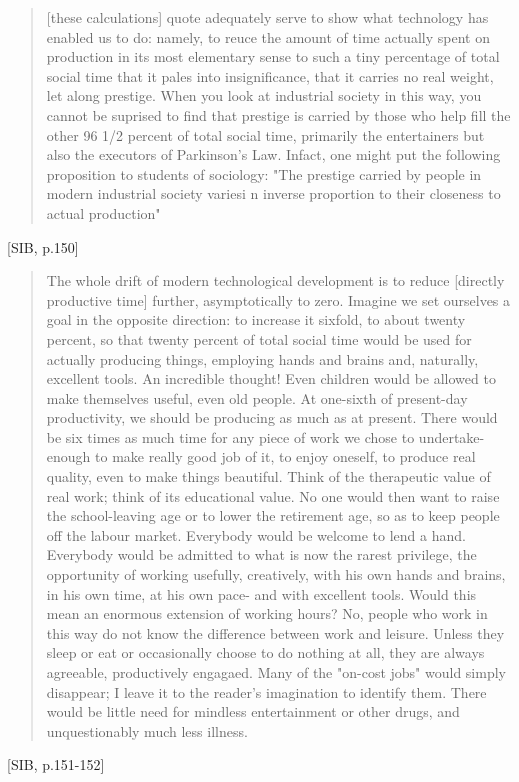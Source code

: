 \begin{quote}
  [these calculations] quote adequately serve to show what technology has enabled us to do: namely, to reuce the amount of time actually spent on production in its most elementary sense to such a tiny percentage of total social time that it pales into insignificance, that it carries no real weight, let along prestige. When you look at industrial society in this way, you cannot be suprised to find that prestige is carried by those who help fill the other 96 1/2 percent of total social time, primarily the entertainers but also the executors of Parkinson's Law. Infact, one might put the following proposition to students of sociology: "The prestige carried by people in modern industrial society variesi n inverse proportion to their closeness to actual production"
\end{quote} [SIB, p.150]

\begin{quote}
  The whole drift of modern technological development is to reduce [directly productive time] further, asymptotically to zero. Imagine we set ourselves a goal in the opposite direction: to increase it sixfold, to about twenty percent, so that twenty percent of total social time would be used for actually producing things, employing hands and brains and, naturally, excellent tools. An incredible thought! Even children would be allowed to make themselves useful, even old people. At one-sixth of present-day productivity, we should be producing as much as at present. There would be six times as much time for any piece of work we chose to undertake- enough to make really good job of it, to enjoy oneself, to produce real quality, even to make things beautiful. Think of the therapeutic value of real work; think of its educational value. No one would then want to raise the school-leaving age or to lower the retirement age, so as to keep people off the labour market. Everybody would be welcome to lend a hand. Everybody would be admitted to what is now the rarest privilege, the opportunity of working usefully, creatively, with his own hands and brains, in his own time, at his own pace- and with excellent tools. Would this mean an enormous extension of working hours? No, people who work in this way do not know the difference between work and leisure. Unless they sleep or eat or occasionally choose to do nothing at all, they are always agreeable, productively engagaed. Many of the "on-cost jobs" would simply disappear; I leave it to the reader's imagination to identify them. There would be little need for mindless entertainment or other drugs, and unquestionably much less illness.
\end{quote}[SIB, p.151-152]


